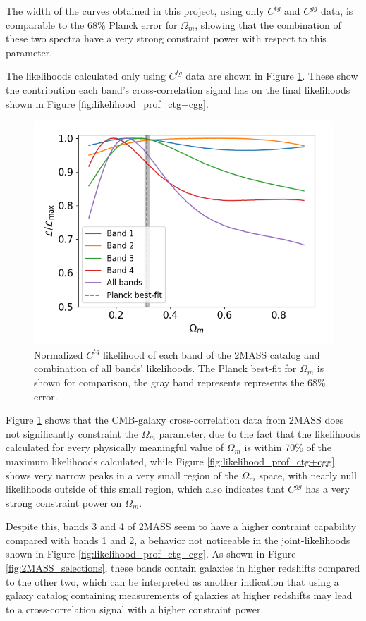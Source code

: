 \documentclass[openany,a4paper,12pt,oneside]{book}
\begin{document}
\begin{spacing}{1.5}
The width of the curves obtained in this project, using only $C^{tg}$ and $C^{gg}$ data, is comparable to the 68\% Planck error for $\Omega_m$, showing that the combination of these two spectra have a very strong constraint power with respect to this parameter.

The likelihoods calculated only using $C^{tg}$ data are shown in Figure \ref{fig:likelihood_prof_ctg}. These show the contribution each band's cross-correlation signal has on the final likelihoods shown in Figure \ref{fig:likelihood_prof_ctg+cgg}.

\begin{figure}[!htb]
	\centering
	\includegraphics[width=.7\linewidth]{Imagens/profile_ctg_Nmc2e7.png}
	\caption{Normalized $C^{tg}$ likelihood of each band of the 2MASS catalog and combination of all bands' likelihoods. The Planck best-fit for $\Omega_m$ is shown for comparison, the gray band represents represents the 68\% error.}
	\label{fig:likelihood_prof_ctg}
\end{figure}

Figure \ref{fig:likelihood_prof_ctg} shows that the CMB-galaxy cross-correlation data from 2MASS does not significantly constraint the $\Omega_m$ parameter, due to the fact that the likelihoods calculated for every physically meaningful value of $\Omega_m$ is within 70\% of the maximum likelihoods calculated, while Figure \ref{fig:likelihood_prof_ctg+cgg} shows very narrow peaks in a very small region of the $\Omega_m$ space, with nearly null likelihoods outside of this small region, which also indicates that $C^{gg}$ has a very strong constraint power on $\Omega_m$.

Despite this, bands 3 and 4 of 2MASS seem to have a higher contraint capability compared with bands 1 and 2, a behavior not noticeable in the joint-likelihoods shown in Figure \ref{fig:likelihood_prof_ctg+cgg}. As shown in Figure \ref{fig:2MASS_selections}, these bands contain galaxies in higher redshifts compared to the other two, which can be interpreted as another indication that using a galaxy catalog containing measurements of galaxies at higher redshifts may lead to a cross-correlation signal with a higher constraint power.


\end{spacing}
\end{document}
